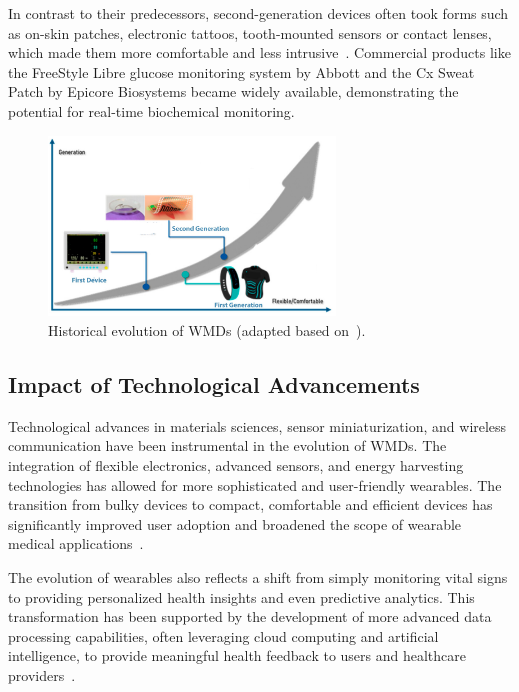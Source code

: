 \documentclass[journal]{IEEEtran}
\begin{document}
    In contrast to their predecessors, second-generation devices often took forms such as on-skin patches, electronic tattoos, tooth-mounted sensors or contact lenses, which made them more comfortable and less intrusive~\cite{Ates2022}. Commercial products like the FreeStyle Libre glucose monitoring system by Abbott and the Cx Sweat Patch by Epicore Biosystems became widely available, demonstrating the potential for real-time biochemical monitoring.

    \begin{figure}[!t]
    \centering
    \includegraphics[width=3in]{Wearables_SEB_2024-2025_Group1/Figuras/history.jpeg}
    \caption{Historical evolution of WMDs (adapted based on~\cite{Ates2022}).}
    \label{fig:histoy}
    \end{figure}

    \subsection{Impact of Technological Advancements}

    Technological advances in materials sciences, sensor miniaturization, and wireless communication have been instrumental in the evolution of WMDs. The integration of flexible electronics, advanced sensors, and energy harvesting technologies has allowed for more sophisticated and user-friendly wearables. The transition from bulky devices to compact, comfortable and efficient devices has significantly improved user adoption and broadened the scope of wearable medical applications~\cite{Ates2022}.

    The evolution of wearables also reflects a shift from simply monitoring vital signs to providing personalized health insights and even predictive analytics. This transformation has been supported by the development of more advanced data processing capabilities, often leveraging cloud computing and artificial intelligence, to provide meaningful health feedback to users and healthcare providers~\cite{Ates2022}.
\end{document}
